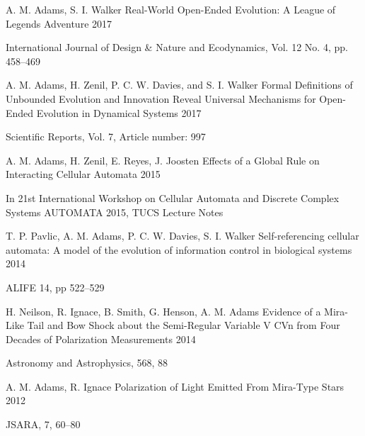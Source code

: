 \begin{cventries}
    
\cventry
    {\textcolor{cmyk-magenta}{A. M. Adams}, S. I. Walker}
    {Real-World Open-Ended Evolution: A League of Legends Adventure}
    {}
    {2017}
    {
    \begin{cvitems}
        \item {International Journal of Design \& Nature and Ecodynamics, Vol. 12 No. 4, pp. 458--469}
    \end{cvitems}
    }
    
\cventry
    {\textcolor{cmyk-magenta}{A. M. Adams}, H. Zenil, P. C. W. Davies, and S. I. Walker}
    {Formal Definitions of Unbounded Evolution and Innovation Reveal Universal Mechanisms for Open-Ended Evolution in Dynamical Systems}
    {}
    {2017}
    {
    \begin{cvitems}
        \item {Scientific Reports, Vol. 7, Article number: 997}
    \end{cvitems}
    }
    
    
\cventry
    {\textcolor{cmyk-magenta}{A. M. Adams}, H. Zenil, E. Reyes, J. Joosten}
    {Effects of a Global Rule on Interacting Cellular Automata}
    {}
    {2015}
    {
    \begin{cvitems}
        \item {In 21st International Workshop on Cellular Automata and Discrete Complex Systems AUTOMATA 2015, TUCS Lecture Notes}
    \end{cvitems}
    }
    
\cventry
    {T. P. Pavlic, \textcolor{cmyk-magenta}{A. M. Adams}, P. C. W. Davies, S. I. Walker}
    {Self-referencing cellular automata: A model of the evolution of information control in biological systems}
    {}
    {2014}
    {
    \begin{cvitems}
        \item {ALIFE 14, pp 522--529}
    \end{cvitems}
    }
    
\cventry
    {H. Neilson, R. Ignace, B. Smith, G. Henson, \textcolor{cmyk-magenta}{A. M. Adams}}
    {Evidence of a Mira-Like Tail and Bow Shock about the Semi-Regular Variable V CVn from Four Decades of Polarization Measurements}
    {}
    {2014}
    {
    \begin{cvitems}
        \item {Astronomy and Astrophysics, 568, 88}
    \end{cvitems}
    }
    
\cventry
    {\textcolor{cmyk-magenta}{A. M. Adams}, R. Ignace}
    {Polarization of Light Emitted From Mira-Type Stars}
    {}
    {2012}
    {
    \begin{cvitems}
        \item {JSARA, 7, 60–80}
    \end{cvitems}
    }
    
\end{cventries}